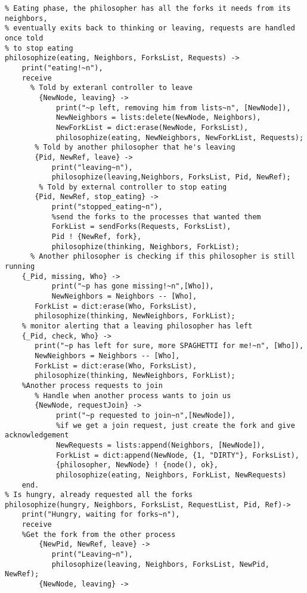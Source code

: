\documentclass[11pt]{article}
\begin{document}
\begin{lstlisting}
% Eating phase, the philosopher has all the forks it needs from its neighbors,
% eventually exits back to thinking or leaving, requests are handled once told
% to stop eating
philosophize(eating, Neighbors, ForksList, Requests) ->
    print("eating!~n"),
    receive
      % Told by exteranl controller to leave
        {NewNode, leaving} -> 
            print("~p left, removing him from lists~n", [NewNode]),
            NewNeighbors = lists:delete(NewNode, Neighbors),
            NewForkList = dict:erase(NewNode, ForksList),
            philosophize(eating, NewNeighbors, NewForkList, Requests);
       % Told by another philosopher that he's leaving
       {Pid, NewRef, leave} ->
           print("leaving~n"),
           philosophize(leaving,Neighbors, ForksList, Pid, NewRef);
        % Told by external controller to stop eating
       {Pid, NewRef, stop_eating} ->
           print("stopped_eating~n"),
           %send the forks to the processes that wanted them
           ForkList = sendForks(Requests, ForksList),
           Pid ! {NewRef, fork},
           philosophize(thinking, Neighbors, ForkList);
      % Another philosopher is checking if this philosopher is still running
    {_Pid, missing, Who} ->
           print("~p has gone missing!~n",[Who]),
           NewNeighbors = Neighbors -- [Who],
	   ForkList = dict:erase(Who, ForksList),
	   philosophize(thinking, NewNeighbors, ForkList);
    % monitor alerting that a leaving philosopher has left
    {_Pid, check, Who} ->
	   print("~p has left for sure, more SPAGHETTI for me!~n", [Who]),
	   NewNeighbors = Neighbors -- [Who],
	   ForkList = dict:erase(Who, ForksList),
	   philosophize(thinking, NewNeighbors, ForkList);
    %Another process requests to join 
       % Handle when another process wants to join us
       {NewNode, requestJoin} ->
            print("~p requested to join~n",[NewNode]),
            %if we get a join request, just create the fork and give acknowledgement
            NewRequests = lists:append(Neighbors, [NewNode]),
            ForkList = dict:append(NewNode, {1, "DIRTY"}, ForksList),
            {philosopher, NewNode} ! {node(), ok},
            philosophize(eating, Neighbors, ForkList, NewRequests)
    end.
% Is hungry, already requested all the forks 
philosophize(hungry, Neighbors, ForksList, RequestList, Pid, Ref)->   
    print("Hungry, waiting for forks~n"),
    receive
    %Get the fork from the other process
        {NewPid, NewRef, leave} ->
           print("Leaving~n"),
           philosophize(leaving, Neighbors, ForksList, NewPid, NewRef);
        {NewNode, leaving} -> 

\end{lstlisting}
\end{document}
